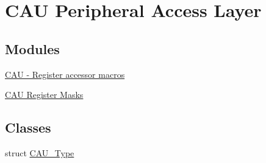 \hypertarget{group__CAU__Peripheral__Access__Layer}{}\section{C\+AU Peripheral Access Layer}
\label{group__CAU__Peripheral__Access__Layer}
\subsection*{Modules}
\begin{DoxyCompactItemize}
\item 
\hyperlink{group__CAU__Register__Accessor__Macros}{C\+A\+U -\/ Register accessor macros}
\item 
\hyperlink{group__CAU__Register__Masks}{C\+A\+U Register Masks}
\end{DoxyCompactItemize}
\subsection*{Classes}
\begin{DoxyCompactItemize}
\item 
struct \hyperlink{structCAU__Type}{C\+A\+U\+\_\+\+Type}
\end{DoxyCompactItemize}
